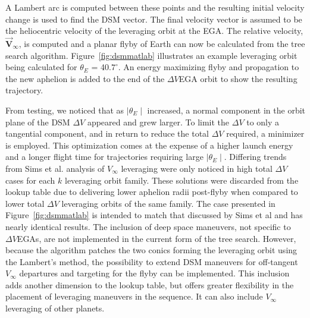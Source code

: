\documentclass[letterpaper, preprint, paper,11pt]{AAS}	%
\begin{document}
A Lambert arc is computed between these points and the resulting initial velocity change is used to find the DSM vector. The final velocity vector is assumed to be the heliocentric velocity of the leveraging orbit at the EGA. The relative velocity, $\vec{\textbf{V}}_{\infty}$, is computed and a planar flyby of Earth can now be calculated from the tree search algorithm. Figure~\ref{fig:dsmmatlab} illustrates an example leveraging orbit being calculated for $\theta_{E}$ = 40.$7^{\circ}$. An energy maximizing flyby and propagation to the new aphelion is added to the end of the $\Delta V$EGA orbit to show the resulting trajectory.

From testing, we noticed that as $\mid\theta_E\mid$ increased, a normal component in the orbit plane of the DSM $\Delta V$ appeared and grew larger. To limit the $\Delta V$ to only a tangential component, and in return to reduce the total $\Delta V$ required, a minimizer is employed. This optimization comes at the expense of a higher launch energy and a longer flight time for trajectories requiring large $\mid\theta_E\mid$. Differing trends from Sims et al. analysis of $V_\infty$ leveraging\cite{sims1994} were only noticed in high total $\Delta V$ cases for each $k$ leveraging orbit family. These solutions were discarded from the lookup table due to delivering lower aphelion radii post-flyby when compared to lower total $\Delta V$ leveraging orbits of the same family. The case presented in Figure~\ref{fig:dsmmatlab} is intended to match that discussed by Sims et al\cite{Sims1997} and has nearly identical results. The inclusion of deep space maneuvers, not specific to $\Delta V$EGAs, are not implemented in the current form of the tree search. However, because the algorithm patches the two conics forming the leveraging orbit using the Lambert's method, the possibility to extend DSM maneuvers for off-tangent $V_\infty$ departures and targeting for the flyby can be implemented. This inclusion adds another dimension to the lookup table, but offers greater flexibility in the placement of  leveraging maneuvers in the sequence. It can also include $V_\infty$ leveraging of other planets.
\end{document}
